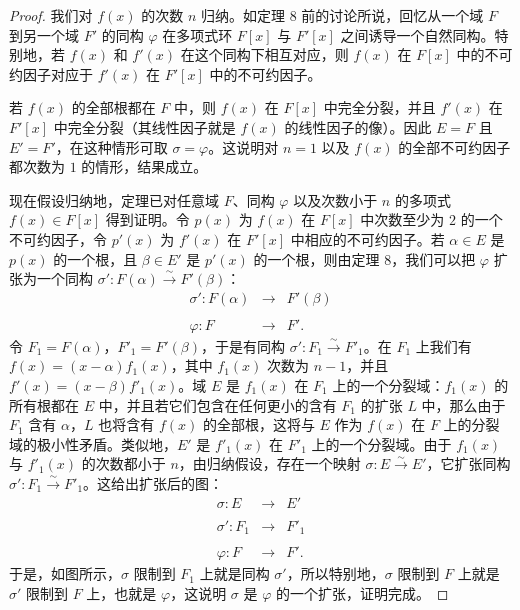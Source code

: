 \begin{proof}
	我们对 $f(x)$ 的次数 $n$ 归纳。如定理 8 前的讨论所说，回忆从一个域 $F$ 到另一个域 $F'$ 的同构 $\varphi$ 在多项式环 $F[x]$ 与 $F'[x]$ 之间诱导一个自然同构。特别地，若 $f(x)$ 和 $f'(x)$ 在这个同构下相互对应，则 $f(x)$ 在 $F[x]$ 中的不可约因子对应于 $f'(x)$ 在 $F'[x]$ 中的不可约因子。
	
	若 $f(x)$ 的全部根都在 $F$ 中，则 $f(x)$ 在 $F[x]$ 中完全分裂，并且 $f'(x)$ 在 $F'[x]$ 中完全分裂（其线性因子就是 $f(x)$ 的线性因子的像）。因此 $E=F$ 且 $E'=F'$，在这种情形可取 $\sigma=\varphi$。这说明对 $n=1$ 以及 $f(x)$ 的全部不可约因子都次数为 $1$ 的情形，结果成立。
	
	现在假设归纳地，定理已对任意域 $F$、同构 $\varphi$ 以及次数小于 $n$ 的多项式 $f(x)\in F[x]$ 得到证明。令 $p(x)$ 为 $f(x)$ 在 $F[x]$ 中次数至少为 $2$ 的一个不可约因子，令 $p'(x)$ 为 $f'(x)$ 在 $F'[x]$ 中相应的不可约因子。若 $\alpha\in E$ 是 $p(x)$ 的一个根，且 $\beta\in E'$ 是 $p'(x)$ 的一个根，则由定理 8，我们可以把 $\varphi$ 扩张为一个同构 $\sigma':F(\alpha)\overset{\sim}{\longrightarrow}F'(\beta)$：
	\[
	\begin{array}{ccc}
		\sigma':F(\alpha)&\longrightarrow&F'(\beta)\\
		& & \\
		\varphi:F&\longrightarrow&F'.
	\end{array}
	\]
	令 $F_1=F(\alpha)$，$F'_1=F'(\beta)$，于是有同构 $\sigma':F_1\overset{\sim}{\longrightarrow}F'_1$。在 $F_1$ 上我们有 $f(x)=(x-\alpha)f_1(x)$，其中 $f_1(x)$ 次数为 $n-1$，并且 $f'(x)=(x-\beta)f'_1(x)$。域 $E$ 是 $f_1(x)$ 在 $F_1$ 上的一个分裂域：$f_1(x)$ 的所有根都在 $E$ 中，并且若它们包含在任何更小的含有 $F_1$ 的扩张 $L$ 中，那么由于 $F_1$ 含有 $\alpha$，$L$ 也将含有 $f(x)$ 的全部根，这将与 $E$ 作为 $f(x)$ 在 $F$ 上的分裂域的极小性矛盾。类似地，$E'$ 是 $f'_1(x)$ 在 $F'_1$ 上的一个分裂域。由于 $f_1(x)$ 与 $f'_1(x)$ 的次数都小于 $n$，由归纳假设，存在一个映射 $\sigma:E\overset{\sim}{\longrightarrow}E'$，它扩张同构 $\sigma':F_1\overset{\sim}{\longrightarrow}F'_1$。这给出扩张后的图：
	\[
	\begin{array}{ccccc}
		\sigma:E&\longrightarrow&E'\\
		& & \\
		\sigma':F_1&\longrightarrow&F'_1\\
		& & \\
		\varphi:F&\longrightarrow&F'.
	\end{array}
	\]
	于是，如图所示，$\sigma$ 限制到 $F_1$ 上就是同构 $\sigma'$，所以特别地，$\sigma$ 限制到 $F$ 上就是 $\sigma'$ 限制到 $F$ 上，也就是 $\varphi$，这说明 $\sigma$ 是 $\varphi$ 的一个扩张，证明完成。
\end{proof}

